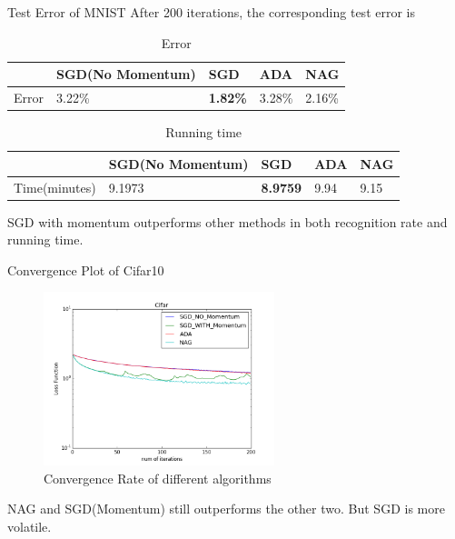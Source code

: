 \documentclass{beamer}
\begin{document}
\begin{frame}{Test Error of MNIST}
After 200 iterations, the corresponding test error is 
\begin{table}[h]
\begin{tabular}{|l|l|l|l|l|}
\hline
      & SGD(No Momentum) & SGD    & ADA    & NAG    \\ \hline
Error & 3.22\%           & \textbf{1.82\%} & 3.28\% & 2.16\% \\ \hline
\end{tabular}
\caption{Error}
\label{my-label}
\end{table}


\begin{table}[h]
\begin{tabular}{|l|l|l|l|l|}
\hline
             & SGD(No Momentum) & SGD    & ADA  & NAG  \\ \hline
Time(minutes) & 9.1973           & \textbf{8.9759} & 9.94 & 9.15 \\ \hline
\end{tabular}
\caption{Running time}
\label{my-label}
\end{table}

SGD with momentum outperforms other methods in both recognition rate and running time.
\end{frame}



\begin{frame}{Convergence Plot of Cifar10}
\begin{figure}[h!]
\centering
\includegraphics[width=0.6\textwidth]{Cifar_Convergence.png}
\caption{Convergence Rate of different algorithms}
\end{figure}
NAG and SGD(Momentum) still outperforms the other two. But SGD is more volatile.
\end{frame}
\end{document}
